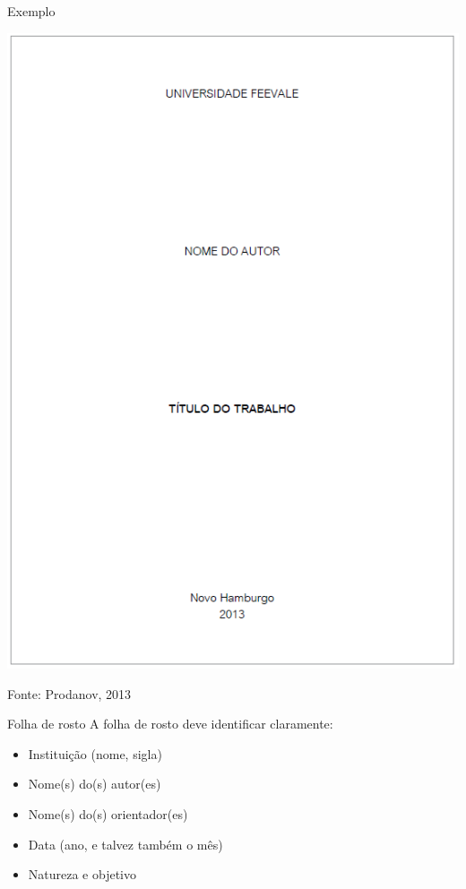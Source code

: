 \documentclass{beamer}
\begin{document}
\begin{frame}{Exemplo}
  \begin{center}
    \includegraphics[height=0.8\textheight]{EstruturaII/capa}
  \end{center}

  \vfill
  Fonte: Prodanov, 2013
\end{frame}

\begin{frame}{Folha de rosto}
A folha de rosto deve identificar claramente:
  \begin{itemize}
  \item Instituição (nome, sigla)
  \item Nome(s) do(s) autor(es)
  \item Nome(s) do(s) orientador(es)
  \item Data (ano, e talvez também o mês)
  \item Natureza e objetivo
  \end{itemize}
\end{frame}
\end{document}
